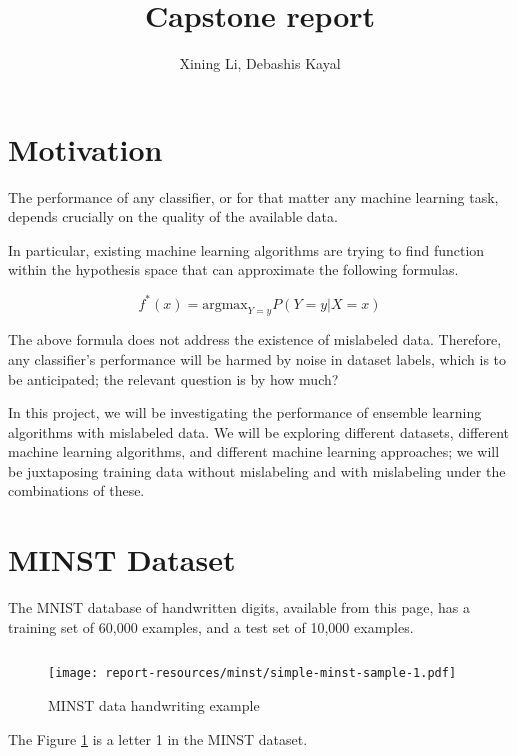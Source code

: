 \documentclass{article}
\author{Xining Li, Debashis Kayal}
\title {Capstone report}
\begin{document}
\maketitle

\section{Motivation}

The performance of any classifier, or for that matter any machine learning task, depends crucially on the quality of the available data. 


In particular, existing machine learning algorithms are trying to find function within the hypothesis space that can approximate the following formulas. 

\begin{equation}
    f^*(x) = {\mathrm {argmax}}_{Y=y} P (Y=y|X=x)
\end{equation}

The above formula does not address the existence of mislabeled data. Therefore, any classifier's performance will be harmed by noise in dataset labels, which is to be anticipated; the relevant question is by how much? 

In this project, we will be investigating the performance of ensemble learning algorithms with mislabeled data. We will be exploring different datasets, different machine learning algorithms, and different machine learning approaches; we will be juxtaposing training data without mislabeling and with mislabeling under the combinations of these. 

\section{MINST Dataset}

The MNIST database of handwritten digits, available from this page, has a training set of 60,000 examples, and a test set of 10,000 examples. 

\inputminted[firstline=16,lastline=20,frame=single,framesep=10pt]{python}{minst/main.py}

\begin{figure}[h!]
    \centering
    \texttt{[image: report-resources/minst/simple-minst-sample-1.pdf]}
    \caption{MINST data handwriting example}
    \label{fig:let1}
\end{figure}

The Figure \ref{fig:let1} is a letter 1 in the MINST dataset. 
\end{document}

